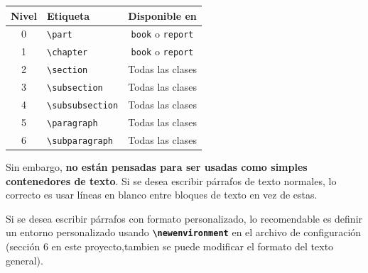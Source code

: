 \begin{center}
  \begin{tabular}{|c|l|c|}
  \hline
  \textbf{Nivel} & \textbf{Etiqueta} & \textbf{Disponible en} \\
  \hline
  0 & \verb|\part| & \verb|book| o \verb|report| \\
  1 & \verb|\chapter| & \verb|book| o \verb|report| \\
  2 & \verb|\section| & Todas las clases \\
  3 & \verb|\subsection| & Todas las clases \\
  4 & \verb|\subsubsection| & Todas las clases \\
  5 & \verb|\paragraph| & Todas las clases \\
  6 & \verb|\subparagraph| & Todas las clases \\
  \hline
  \end{tabular}
  \end{center}

Sin embargo, \textbf{no están pensadas para ser usadas como simples contenedores de texto}.  
Si se desea escribir párrafos de texto normales, lo correcto es usar líneas en blanco entre bloques de texto en vez de estas.

\begin{custompar}
  Si se desea escribir párrafos con formato personalizado, lo recomendable es definir un entorno personalizado usando 
  \textbf{\texttt{\textbackslash newenvironment}} en el archivo de configuración (sección 6 en este proyecto,tambien se puede modificar el formato del texto general).
  \end{custompar}

